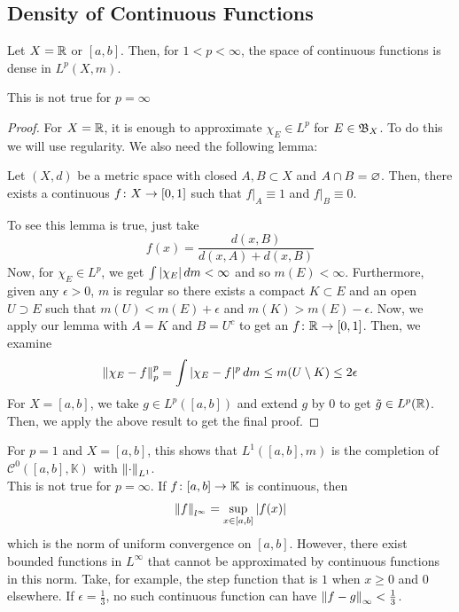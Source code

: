 \documentclass[11pt,leqno,oneside]{amsbook}
\numberwithin{thm}{section}
\newcommand{\K}{\mathbb{K}} %
\renewcommand{\emptyset}{\varnothing}
\begin{document}
\subsection{Density of Continuous Functions}
  \begin{thm}
    Let \(X = \R\) or \([a,b]\). Then, for \(1 < p < \infty\), the
    space of continuous functions is dense in \(L^p(X,m)\).
  \end{thm}
  \begin{rmk}
    This is not true for \(p=\infty\)
  \end{rmk}
  \begin{proof}
    For \(X=\R\), it is enough to approximate \(\chi_E \in L^p\) for \(E \in
    \B_X\). To do this we will use regularity. We also need the
    following lemma:
    \begin{lem}
      Let \((X,d)\) be a metric space with closed \(A,B \subset X\)
      and \(A \intersect B = \emptyset\). Then, there exists a continuous \(f
      \from X \to [0,1]\) such that \(f|_A \equiv 1\) and \(f|_B
      \equiv 0\).
    \end{lem}
    To see this lemma is true, just take \[
      f(x) = \frac{d(x,B)}{d(x,A) + d(x,B)}
    \]
    Now, for \(\chi_E \in L^p\), we get \(\int |\chi_E| \d m <
    \infty\) and so \(m(E) < \infty\). Furthermore, given any
    \(\epsilon > 0\), \(m\) is regular so there exists a compact \(K
    \subset E\) and an open \(U \supset E\) such that \(m(U) <
    m(E)+\epsilon\) and \(m(K) > m(E)-\epsilon\). Now, we apply our
    lemma with \(A = K\) and \(B = U^c\) to get an \(f \from \R \to
    [0,1]\). Then, we examine \[
      \norm[\chi_E - f]_p^p = \int |\chi_E - f|^p \d m \leq m(U
      \setminus K) \leq 2 \epsilon
    \]
    For \(X = [a,b]\), we take \(g \in L^p([a,b])\) and extend \(g\)
    by 0 to get \(\tilde{g} \in L^p(\R)\). Then, we apply the above
    result to get the final proof.
  \end{proof}
  \begin{rmk}
    For \(p=1\) and \(X = [a,b]\), this shows that \(L^1([a,b],m)\) is
    the completion of \(\mathcal{C}^0([a,b],\K)\) with
    \(\norm_{L^1}\). \\

    This is not true for \(p=\infty\). If \(f \from [a,b] \to \K\) is
    continuous, then \[
      \norm[f]_{l^\infty} = \sup_{x \in [a,b]} |f(x)|
    \]
    which is the norm of uniform convergence on \([a,b]\).  However,
    there exist bounded functions in \(L^\infty\) that cannot be
    approximated by continuous functions in this norm. Take, for
    example, the step function that is \(1\) when \(x \geq 0\) and
    \(0\) elsewhere. If \(\epsilon = \frac{1}{3}\), no such continuous
    function can have \(\norm[f-g]_\infty < \frac{1}{3}\).
  \end{rmk}
\end{document}
